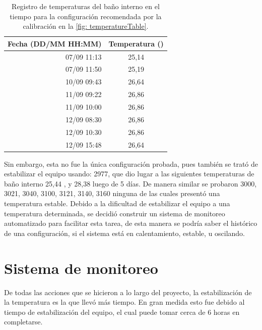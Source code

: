 	\begin{table}[h]
		\centering
		\caption{Registro de temperaturas del baño interno en el tiempo para la configuración recomendada por la calibración en la \autoref{fig: temperatureTable}.}
		\begin{tabular}{r|c}
			\hline
			\textbf{Fecha (DD/MM HH:MM)} & \textbf{Temperatura (\grad{})} \\
			\hline
			07/09 11:13 & 25,14 \\
			07/09 11:50 & 25,19 \\
			10/09 09:43 & 26,64 \\
			11/09 09:22 & 26,86 \\
			11/09 10:00 & 26,86 \\
			12/09 08:30 & 26,86 \\
			12/09 10:30 & 26,86 \\
			12/09 15:48 & 26,64 \\
			\hline
		\end{tabular}
		\label{tb: temperatureRegister}
	\end{table}
	
	Sin embargo, esta no fue la única configuración probada, pues también se trató de estabilizar el equipo usando: 2977, que dio lugar a las siguientes temperaturas de baño interno 25,44 \grad{}, y 28,38 \grad{} luego de 5 días. De manera similar se probaron 3000, 3021, 3040, 3100, 3121, 3140, 3160 ninguna de las cuales presentó una temperatura estable. Debido a la dificultad de estabilizar el equipo a una temperatura determinada, se decidió construir un sistema de monitoreo automatizado para facilitar esta tarea, de esta manera se podría saber el histórico de una configuración, si el sistema está en calentamiento, estable, u oscilando.
	\section{Sistema de monitoreo}
	
	

	De todas las acciones que se hicieron a lo largo del proyecto, la estabilizaci\'on de la temperatura es la que llev\'o m\'as tiempo. En gran medida esto fue debido al tiempo de estabilizaci\'on del equipo, el cual puede tomar cerca de 6 horas en completarse.
